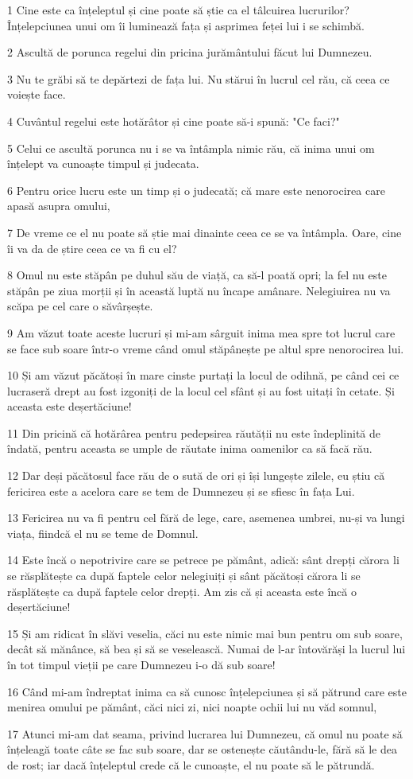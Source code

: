 \par 1 Cine este ca înțeleptul și cine poate să știe ca el tâlcuirea lucrurilor? Înțelepciunea unui om îi luminează fața și asprimea feței lui i se schimbă.
\par 2 Ascultă de porunca regelui din pricina jurământului făcut lui Dumnezeu.
\par 3 Nu te grăbi să te depărtezi de fața lui. Nu stărui în lucrul cel rău, că ceea ce voiește face.
\par 4 Cuvântul regelui este hotărâtor și cine poate să-i spună: "Ce faci?"
\par 5 Celui ce ascultă porunca nu i se va întâmpla nimic rău, că inima unui om înțelept va cunoaște timpul și judecata.
\par 6 Pentru orice lucru este un timp și o judecată; că mare este nenorocirea care apasă asupra omului,
\par 7 De vreme ce el nu poate să știe mai dinainte ceea ce se va întâmpla. Oare, cine îi va da de știre ceea ce va fi cu el?
\par 8 Omul nu este stăpân pe duhul său de viață, ca să-l poată opri; la fel nu este stăpân pe ziua morții și în această luptă nu încape amânare. Nelegiuirea nu va scăpa pe cel care o săvârșește.
\par 9 Am văzut toate aceste lucruri și mi-am sârguit inima mea spre tot lucrul care se face sub soare într-o vreme când omul stăpânește pe altul spre nenorocirea lui.
\par 10 Și am văzut păcătoși în mare cinste purtați la locul de odihnă, pe când cei ce lucraseră drept au fost izgoniți de la locul cel sfânt și au fost uitați în cetate. Și aceasta este deșertăciune!
\par 11 Din pricină că hotărârea pentru pedepsirea răutății nu este îndeplinită de îndată, pentru aceasta se umple de răutate inima oamenilor ca să facă rău.
\par 12 Dar deși păcătosul face rău de o sută de ori și își lungește zilele, eu știu că fericirea este a acelora care se tem de Dumnezeu și se sfiesc în fața Lui.
\par 13 Fericirea nu va fi pentru cel fără de lege, care, asemenea umbrei, nu-și va lungi viața, fiindcă el nu se teme de Domnul.
\par 14 Este încă o nepotrivire care se petrece pe pământ, adică: sânt drepți cărora li se răsplătește ca după faptele celor nelegiuiți și sânt păcătoși cărora li se răsplătește ca după faptele celor drepți. Am zis că și aceasta este încă o deșertăciune!
\par 15 Și am ridicat în slăvi veselia, căci nu este nimic mai bun pentru om sub soare, decât să mănânce, să bea și să se veselească. Numai de l-ar întovărăși la lucrul lui în tot timpul vieții pe care Dumnezeu i-o dă sub soare!
\par 16 Când mi-am îndreptat inima ca să cunosc înțelepciunea și să pătrund care este menirea omului pe pământ, căci nici zi, nici noapte ochii lui nu văd somnul,
\par 17 Atunci mi-am dat seama, privind lucrarea lui Dumnezeu, că omul nu poate să înțeleagă toate câte se fac sub soare, dar se ostenește căutându-le, fără să le dea de rost; iar dacă înțeleptul crede că le cunoaște, el nu poate să le pătrundă.

